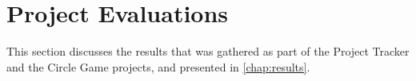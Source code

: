 
\section{Project Evaluations}
\label{sec:project_evaluations}

This section discusses the results that was gathered as part of the Project Tracker and the Circle Game projects, and presented in \autoref{chap:results}.